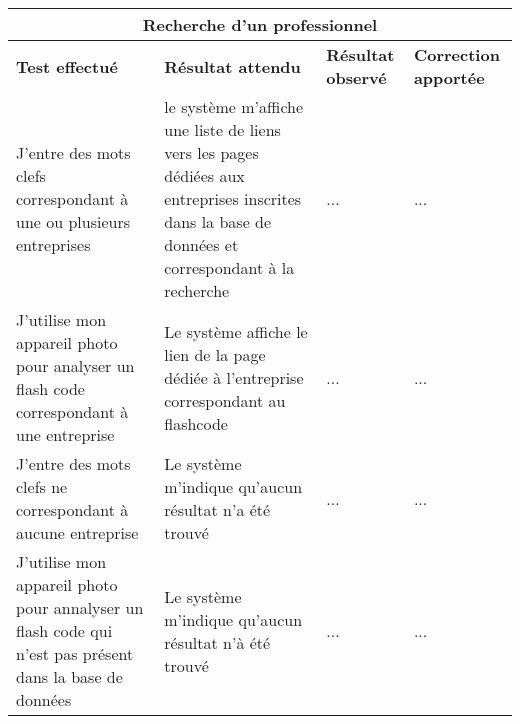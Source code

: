 \documentclass{article}
\begin{document}
  \begin{center}
    \begin{tabular}{|p{4cm}|p{4cm}|p{4cm}|p{4cm}|}
      \hline
      \multicolumn{4}{|c|}{\textbf{Recherche d'un professionnel}} \\
      \hline
      \textbf{Test effectué} & \textbf{Résultat attendu} & \textbf{Résultat observé} & \textbf{Correction apportée} \\

      \hline
      J'entre des mots clefs correspondant à une ou plusieurs entreprises&
      le système m'affiche une liste de liens vers les pages dédiées aux entreprises inscrites dans la base de données et correspondant à la recherche&
      ...&
      ... \\

      \hline
      \hline
      J'utilise mon appareil photo pour analyser un flash code correspondant à une entreprise&
     Le système affiche le lien de la page dédiée à l'entreprise correspondant au flashcode&
      ...&
      ... \\

      \hline
      \hline
      J'entre des mots clefs ne correspondant à aucune entreprise&
      Le système m'indique qu'aucun résultat n'a été trouvé&
      ...&
      ... \\

      \hline
      \hline
      J'utilise mon appareil photo pour annalyser un flash code qui n'est pas présent dans la base de données&
      Le système m'indique qu'aucun résultat n'à été trouvé &
      ...&
      ... \\

     

      



      \hline

    \end{tabular}
  \end{center}
\end{document}
